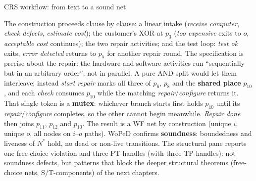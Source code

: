 \begin{examplebox}{CRS workflow: from text to a sound net}
\begin{center}
{}
\end{center}
The construction proceeds clause by clause: a linear intake (\emph{receive computer}, \emph{check defects}, \emph{estimate cost}); the customer's XOR at $p_3$ (\emph{too expensive} exits to $o$, \emph{acceptable cost} continues); the two repair activities; and the test loop: \emph{test ok} exits, \emph{error detected} returns to $p_5$ for another repair round. The specification is precise about the repair: the hardware and software activities run ``sequentially but in an arbitrary order'': not in parallel. A pure AND-split would let them interleave; instead \emph{start repair} marks all three of $p_6$, $p_8$ and the \textbf{shared place} $p_{10}$, and each \emph{check} consumes $p_{10}$ while the matching \emph{repair}/\emph{configure} returns it. That single token is a \textbf{mutex}: whichever branch starts first holds $p_{10}$ until its \emph{repair}/\emph{configure} completes, so the other cannot begin meanwhile. \emph{Repair done} then joins $p_{11}$, $p_{12}$ and $p_{10}$. The result is a WF net by construction (unique $i$, unique $o$, all nodes on $i$--$o$ paths). WoPeD confirms \textbf{soundness}: boundedness and liveness of $N^*$ hold, no dead or non-live transitions. The structural pane reports one free-choice violation and three PT-handles (with three TP-handles): not soundness defects, but patterns that block the deeper structural theorems (free-choice nets, S/T-components) of the next chapters.
\end{examplebox}
